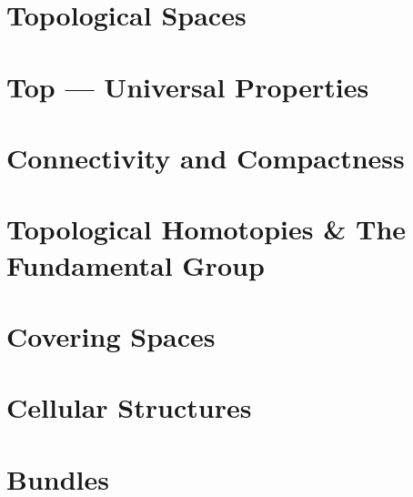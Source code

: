 \documentclass[../../../deep-dive]{subfiles}
\begin{document}
\chapter{Topological Spaces}









\chapter{\textbf{Top} --- Universal Properties}





\chapter{Connectivity and Compactness}



\chapter{Topological Homotopies \& The Fundamental Group}



\chapter{Covering Spaces}



\chapter{Cellular Structures}



\chapter{Bundles}


\end{document}
